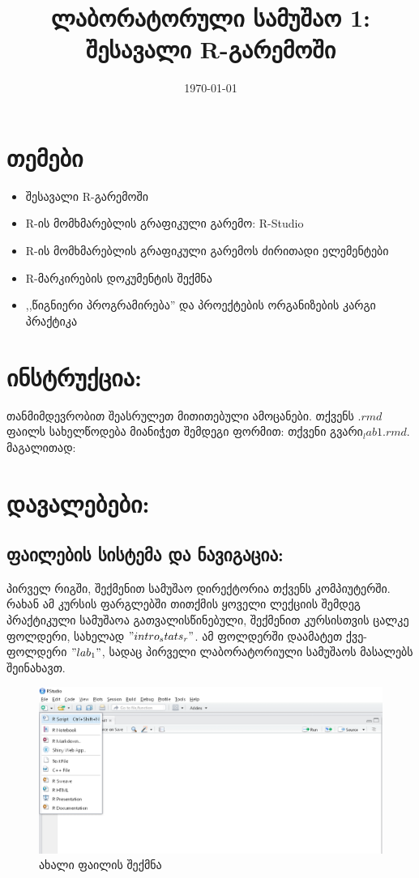 \documentclass{article}
\title{ლაბორატორული სამუშაო 1: შესავალი R-გარემოში}
\date{\today}
\begin{document}
\maketitle
\section*{თემები}
\begin{itemize}
\item შესავალი R-გარემოში
\item R-ის მომხმარებლის გრაფიკული გარემო: R-Studio
\item R-ის მომხმარებლის გრაფიკული გარემოს ძირითადი ელემენტები
\item R-მარკირების დოკუმენტის შექმნა
\item ,,წიგნიერი პროგრამირება'' და პროექტების ორგანიზების კარგი პრაქტიკა 
\end{itemize}

\section*{ინსტრუქცია:}

თანმიმდევრობით შეასრულეთ მითითებული ამოცანები. თქვენს $.rmd$ ფაილს სახელწოდება მიანიჭეთ შემდეგი ფორმით: თქვენი გვარი$_lab1.rmd$. მაგალითად:


\section*{დავალებები:}

\subsection*{ფაილების სისტემა და ნავიგაცია:}

პირველ რიგში, შექმენით სამუშაო დირექტორია თქვენს კომპიუტერში. რახან ამ კურსის ფარგლებში თითქმის ყოველი ლექციის შემდეგ პრაქტიკული სამუშაოა გათვალისწინებული, შექმენით კურსისთვის ცალკე ფოლდერი, სახელად $"intro_stats_r"$. ამ ფოლდერში დაამატეთ ქვე-ფოლდერი $"lab_1"$, სადაც პირველი ლაბორატორიული სამუშაოს მასალებს შეინახავთ.

\begin{figure}[h]
\centering
\includegraphics[width=\textwidth]{img/new_menu.PNG}
\caption{ახალი ფაილის შექმნა}
    \label{create:file}
\end{figure}
\end{document}
